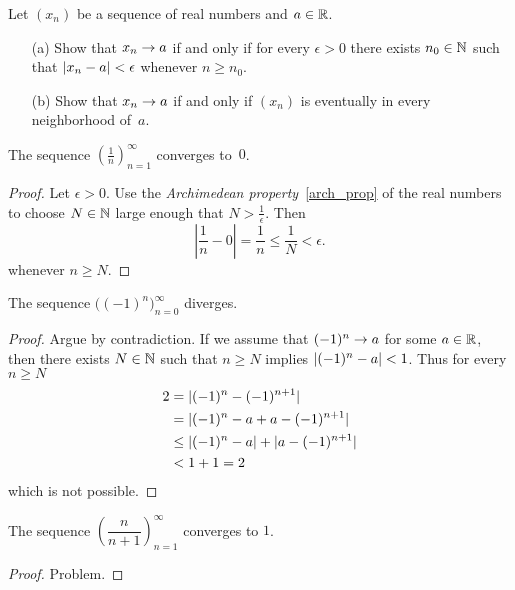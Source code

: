 \begin{prob}\label{cond_conv_seq} Let $(x_n)$ be a sequence of real numbers and $a \in \mathbb{R}$.
 \begin{enumerate}
  \item[(a)]  Show that $x_n \rightarrow a$ if and only if for every $\epsilon > 0$ there exists
$n_0 \in \mathbb{N}$ such that $\lvert x_n - a\rvert < \epsilon$ whenever $n \ge n_0$.
  \item[(b)] Show that $x_n \rightarrow a$ if and only if $(x_n)$ is eventually in every
neighborhood of~$a$.
 \end{enumerate}
\end{prob}


\begin{exam}\label{seq_exam1} The sequence $(\frac1n)_{n=1}^\infty$ converges to~$0$.
\end{exam}

\begin{proof} Let $\epsilon > 0$. Use the \emph{Archimedean property}~\ref{arch_prop} of the
real numbers to choose $N \in \mathbb{N}$ large enough that $N > \frac1\epsilon$. Then
   \[\left\lvert\frac1n - 0\right\rvert = \frac1n \le \frac1N < \epsilon.\]
whenever $n \ge N$.
\end{proof}

\begin{exam}\label{exam_div_seq} The sequence $\bigl((-1)^n\bigr)_{n=0}^\infty$ diverges.
\end{exam}

\begin{proof} Argue by contradiction. If we assume that $(-1)^n \rightarrow a$ for some $a \in \mathbb{R}$,
then there exists $N \in \mathbb{N}$ such that $n \ge N$ implies $\lvert(-1)^n - a\rvert < 1$. Thus for
every $n \ge N$
 \begin{align*}
        2 &=   \lvert(-1)^n - (-1)^{n+1}\rvert \\
          &=   \lvert(-1)^n - a + a - (-1)^{n+1}\rvert \\
          &\le \lvert(-1)^n - a\rvert + \lvert a - (-1)^{n+1}\rvert \\
          &<   1 + 1  = 2
 \end{align*}
which is not possible.
\end{proof}

\begin{exam} The sequence  $\left(\dfrac n{n+1}\right)_{n=1}^\infty$ converges to $1$.
\end{exam}

\begin{proof} Problem. \ns  \end{proof}

